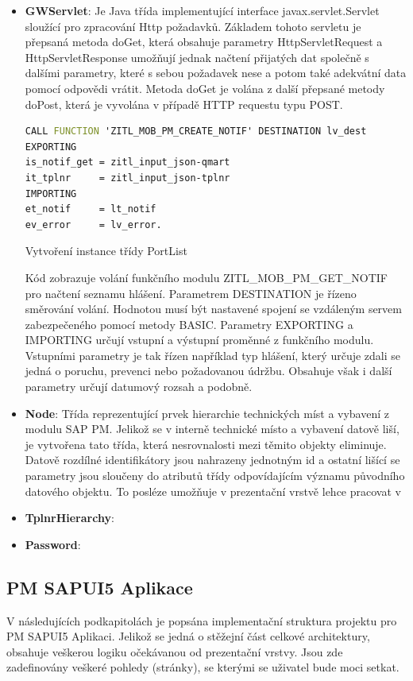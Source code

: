 \documentclass[thesis=M,czech]{FITthesis}[2012/06/26]
\begin{document}
\begin{itemize}
	\item
	\textbf{GWServlet}: Je Java třída implementující interface javax.servlet.Servlet sloužící pro zpracování Http požadavků. Základem tohoto servletu je přepsaná metoda doGet, která obsahuje parametry HttpServletRequest a HttpServletResponse umožňují jednak načtení přijatých dat společně s dalšími parametry, které s sebou požadavek nese a potom také adekvátní data pomocí odpovědi vrátit. Metoda doGet je volána z další přepsané metody doPost, která je vyvolána v případě HTTP requestu typu POST. 
	
	\begin{algorithm}[H]	
		\begin{lstlisting}[language = VHDL]  
CALL FUNCTION 'ZITL_MOB_PM_CREATE_NOTIF' DESTINATION lv_dest
EXPORTING
is_notif_get = zitl_input_json-qmart
it_tplnr     = zitl_input_json-tplnr
IMPORTING
et_notif     = lt_notif
ev_error     = lv_error.
		\end{lstlisting}
		\caption{Vytvoření instance třídy PortList}	
		\label{code:rfc_call}
		\small Kód zobrazuje volání funkčního modulu ZITL\_MOB\_PM\_GET\_NOTIF pro načtení seznamu hlášení. Parametrem DESTINATION je řízeno směrování volání. Hodnotou musí být nastavené spojení se vzdáleným servem zabezpečeného pomocí metody BASIC. Parametry EXPORTING a IMPORTING určují vstupní a výstupní proměnné z funkčního modulu. Vstupními parametry je tak řízen například typ hlášení, který určuje zdali se jedná o poruchu, prevenci nebo požadovanou údržbu. Obsahuje však i další parametry určují datumový rozsah a podobně.
	\end{algorithm}	
	
	
	\item
	\textbf{Node}: Třída reprezentující prvek hierarchie technických míst a vybavení z modulu SAP PM. Jelikož se v interně technické místo a vybavení datově liší, je vytvořena tato třída, která nesrovnalosti mezi těmito objekty eliminuje. Datově rozdílné identifikátory jsou nahrazeny jednotným id a ostatní lišící se parametry jsou sloučeny do atributů třídy odpovídajícím významu původního datového objektu. To posléze umožňuje v prezentační vrstvě lehce pracovat v 
	\item
	\textbf{TplnrHierarchy}:
	\item
	\textbf{Password}:
\end{itemize} 

\subsection{PM SAPUI5 Aplikace}
V následujících podkapitolách je popsána implementační struktura projektu pro PM SAPUI5 Aplikaci. Jelikož se jedná o stěžejní část celkové architektury, obsahuje veškerou logiku očekávanou od prezentační vrstvy. Jsou zde zadefinovány veškeré pohledy (stránky), se kterými se uživatel bude moci setkat.  
\end{document}
